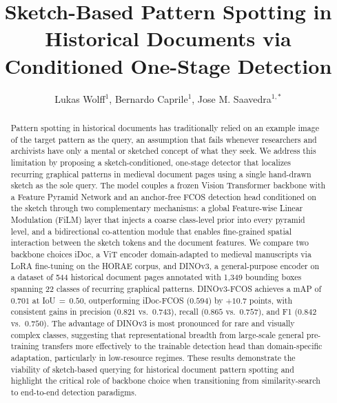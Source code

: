 \documentclass{iopjournal}
\begin{document}

\title{Sketch-Based Pattern Spotting in Historical Documents 
       via Conditioned One-Stage Detection}

\author{Lukas Wolff$^1$, Bernardo Caprile$^1$, Jose M. Saavedra$^{1,*}$}





\begin{abstract}
Pattern spotting in historical documents has traditionally relied on an example
image of the target pattern as the query, an assumption that fails whenever
researchers and archivists have only a mental or sketched concept of what they
seek.
We address this limitation by proposing a sketch-conditioned, one-stage detector
that localizes recurring graphical patterns in medieval document pages using a
single hand-drawn sketch as the sole query.
The model couples a frozen Vision Transformer backbone with a Feature Pyramid
Network and an anchor-free FCOS detection head conditioned on the sketch through
two complementary mechanisms: a global Feature-wise Linear Modulation (FiLM)
layer that injects a coarse class-level prior into every pyramid level, and a
bidirectional co-attention module that enables fine-grained spatial interaction
between the sketch tokens and the document features.
We compare two backbone choices iDoc, a ViT encoder domain-adapted to
medieval manuscripts via LoRA fine-tuning on the HORAE corpus, and DINOv3, a
general-purpose encoder on a dataset of 544 historical document pages
annotated with 1{,}349 bounding boxes spanning 22 classes of recurring
graphical patterns.
DINOv3-FCOS achieves a mAP of $0.701$ at IoU$\,{=}\,0.50$, outperforming
iDoc-FCOS ($0.594$) by $+10.7$ points, with consistent gains in precision
($0.821$ vs.\ $0.743$), recall ($0.865$ vs.\ $0.757$), and F1 ($0.842$
vs.\ $0.750$).
The advantage of DINOv3 is most pronounced for rare and visually complex
classes, suggesting that representational breadth from large-scale general
pre-training transfers more effectively to the trainable detection head than
domain-specific adaptation, particularly in low-resource regimes.
These results demonstrate the viability of sketch-based querying for historical
document pattern spotting and highlight the critical role of backbone choice
when transitioning from similarity-search to end-to-end detection paradigms.
\end{abstract}
\end{document}
